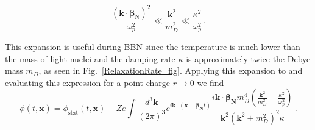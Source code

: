 \begin{equation}\label{eq:expansion}
\frac{(\boldsymbol{k}\cdot\boldsymbol{\beta}_{\text{N}})^2}{\omega_p^2} \ll \frac{\boldsymbol{k}^2}{m_D^2} \ll \frac{\kappa^2}{\omega_p^2}\, .
\end{equation}


This expansion is useful during BBN since the temperature is much lower than the mass of light nuclei and the damping rate $\kappa$ is approximately twice the Debye mass $m_D$, as seen in Fig.~\ref{RelaxationRate_fig}. Applying this expansion to  and evaluating this expression for a point charge $r \rightarrow 0$ we find
\begin{equation}\label{eq:ddsint}
\phi(t,\boldsymbol{x}) =\phi_{\text{stat}}(t,\boldsymbol{x})-Ze\int \frac{d^3\boldsymbol{k}}{(2\pi)^3} e^{ i\boldsymbol{k}\cdot(\boldsymbol{x}-\boldsymbol{\beta_{\text{N}}} t)}\frac{i \boldsymbol{k}\cdot \boldsymbol{\beta_{\text{N}}} m_D^4 (\frac{\boldsymbol{k}^2}{m_D^2} - \frac{\kappa^2}{\omega_p^2})}{\boldsymbol{k}^2(\boldsymbol{k}^2+m_D^2)^2\kappa}\,.
\end{equation}
